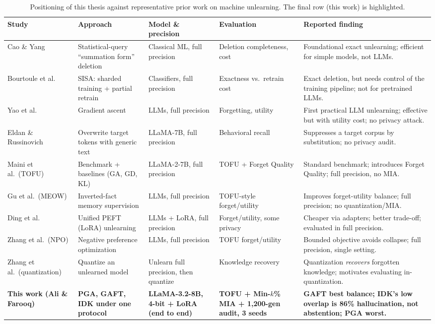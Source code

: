 \documentclass[a4paper,12pt]{report}
\begin{document}
\begin{table}[htbp]
\centering
\caption{Positioning of this thesis against representative prior work on machine unlearning. The final row (this work) is highlighted.}
\label{tab:priorwork}
\footnotesize
\renewcommand{\arraystretch}{1.25}
\begin{tabular}{p{2.0cm} p{2.6cm} p{2.2cm} p{2.4cm} p{3.0cm}}
\hline
\textbf{Study} & \textbf{Approach} & \textbf{Model \& precision} & \textbf{Evaluation} & \textbf{Reported finding} \\
\hline
Cao \& Yang \parencite{cao2015unlearning} & Statistical-query ``summation form'' deletion & Classical ML, full precision & Deletion completeness, cost & Foundational exact unlearning; efficient for simple models, not LLMs. \\
Bourtoule et al.\ \parencite{bourtoule2021machine} & SISA: sharded training + partial retrain & Classifiers, full precision & Exactness vs.\ retrain cost & Exact deletion, but needs control of the training pipeline; not for pretrained LLMs. \\
Yao et al.\ \parencite{yao2023unlearning} & Gradient ascent & LLMs, full precision & Forgetting, utility & First practical LLM unlearning; effective but with utility cost; no privacy attack. \\
Eldan \& Russinovich \parencite{eldan2023harrypotter} & Overwrite target tokens with generic text & LLaMA-7B, full precision & Behavioral recall & Suppresses a target corpus by substitution; no privacy audit. \\
Maini et al.\ (TOFU) \parencite{maini2024tofu} & Benchmark + baselines (GA, GD, KL) & LLaMA-2-7B, full precision & TOFU + Forget Quality & Standard benchmark; introduces Forget Quality; full precision, no MIA. \\
Gu et al.\ (MEOW) \parencite{gu2024meow} & Inverted-fact memory supervision & LLMs, full precision & TOFU-style forget/utility & Improves forget-utility balance; full precision; no quantization/MIA. \\
Ding et al.\ \parencite{ding2024peft} & Unified PEFT (LoRA) unlearning & LLMs + LoRA, full precision & Forget/utility, some privacy & Cheaper via adapters; better trade-off; evaluated in full precision. \\
Zhang et al.\ (NPO) \parencite{zhang2024npo} & Negative preference optimization & LLMs, full precision & TOFU forget/utility & Bounded objective avoids collapse; full precision, single setting. \\
Zhang et al.\ (quantization) \parencite{zhang2024quantization} & Quantize an unlearned model & Unlearn full precision, then quantize & Knowledge recovery & Quantization \emph{recovers} forgotten knowledge; motivates evaluating in-quantization. \\
\hline
\textbf{This work (Ali \& Farooq)} & \textbf{PGA, GAFT, IDK under one protocol} & \textbf{LLaMA-3.2-8B, 4-bit + LoRA (end to end)} & \textbf{TOFU + Min-$k$\% MIA + 1{,}200-gen audit, 3 seeds} & \textbf{GAFT best balance; IDK's low overlap is 86\% hallucination, not abstention; PGA worst.} \\
\hline
\end{tabular}
\end{table}
\end{document}
